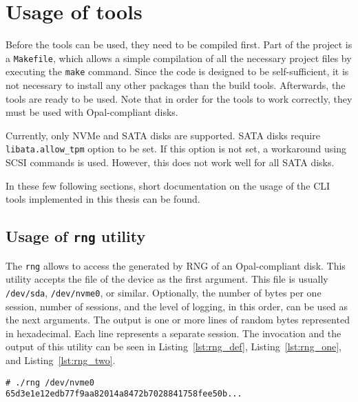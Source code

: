 \appendix


\chapter{Usage of tools}
\label{appendix:usage}

Before the tools can be used, they need to be compiled first. Part of the project is a \verb|Makefile|, which allows a simple compilation of all the necessary project files by executing the \verb|make| command. Since the code is designed to be self-sufficient, it is not necessary to install any other packages than the build tools. Afterwards, the tools are ready to be used.
Note that in order for the tools to work correctly, they must be used with Opal-compliant disks. 

Currently, only NVMe and SATA disks are supported. SATA disks require \verb|libata.allow_tpm| option to be set. If this option is not set, a workaround using SCSI commands is used. However, this does not work well for all SATA disks.

In these few following sections, short documentation on the usage of the CLI tools implemented in this thesis can be found.

\section{Usage of \texttt{rng} utility}

The \verb|rng| allows to access the generated by RNG of an Opal-compliant disk.
This utility accepts the file of the device as the first argument. This file is usually \verb|/dev/sda|, \verb|/dev/nvme0|, or similar.
Optionally, the number of bytes per one session, number of sessions, and the level of logging, in this order, can be used as the next arguments.
The output is one or more lines of random bytes represented in hexadecimal. Each line represents a separate session. The invocation and the output of this utility can be seen in Listing~\ref{lst:rng_def}, Listing~\ref{lst:rng_one}, and Listing~\ref{lst:rng_two}.



\begin{lstlisting}[caption=Execution with default arguments,label={lst:rng_def}]
# ./rng /dev/nvme0
65d3e1e12edb77f9aa82014a8472b7028841758fee50b...
\end{lstlisting}

